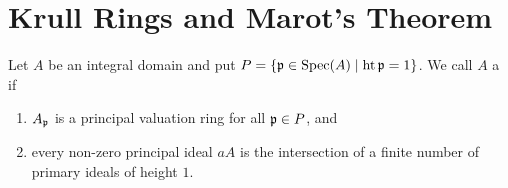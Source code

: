\documentclass[../main]{subfiles}
\begin{document}
\section{Krull Rings and Marot's Theorem}\label{sec:41}

\newparagraph Let $A$ be an integral domain and put $P=\{\mathfrak{p} \in \operatorname{Spec}(A) \mid\operatorname{ht}\mathfrak{p}=1\}$. We call $A$ a  if
\begin{enumerate}[label = (\arabic*)]
    \item $A_{\mathfrak{p}}$ is a principal valuation ring for all $\mathfrak{p} \in P$, and
    \item every non-zero principal ideal $aA$ is the intersection of a finite number of primary ideals of height $1$.
\end{enumerate}
\end{document}
